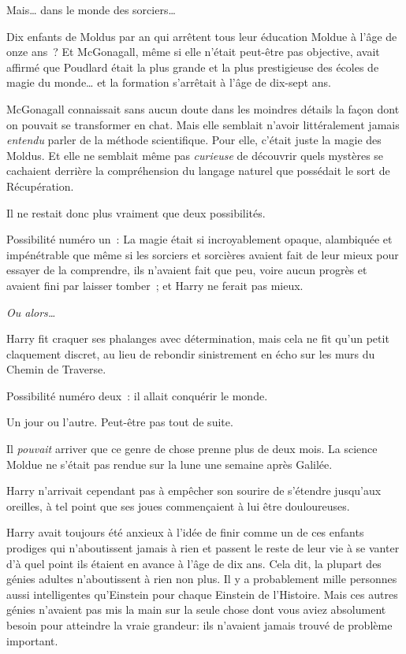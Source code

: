 Mais… dans le monde des sorciers…

Dix enfants de Moldus par an qui arrêtent tous leur éducation Moldue à l'âge de onze ans~?
Et McGonagall, même si elle n'était peut-être pas objective, avait affirmé que Poudlard était la plus grande et la plus prestigieuse des écoles de magie du monde… et la formation s'arrêtait à l'âge de dix-sept ans.

McGonagall connaissait sans aucun doute dans les moindres détails la façon dont on pouvait se transformer en chat.
Mais elle semblait n'avoir littéralement jamais \emph{entendu} parler de la méthode scientifique.
Pour elle, c'était juste la magie des Moldus.
Et elle ne semblait même pas \emph{curieuse} de découvrir quels mystères se cachaient derrière la compréhension du langage naturel que possédait le sort de Récupération.

Il ne restait donc plus vraiment que deux possibilités.

Possibilité numéro un~: La magie était si incroyablement opaque, alambiquée et impénétrable que même si les sorciers et sorcières avaient fait de leur mieux pour essayer de la comprendre, ils n'avaient fait que peu, voire aucun progrès et avaient fini par laisser tomber~; et Harry ne ferait pas mieux.

\emph{Ou alors…}

Harry fit craquer ses phalanges avec détermination, mais cela ne fit qu'un petit claquement discret, au lieu de rebondir sinistrement en écho sur les murs du Chemin de Traverse.

Possibilité numéro deux~: il allait conquérir le monde.

Un jour ou l'autre. Peut-être pas tout de suite.

Il \emph{pouvait} arriver que ce genre de chose prenne plus de deux mois.
La science Moldue ne s'était pas rendue sur la lune une semaine après Galilée.

Harry n'arrivait cependant pas à empêcher son sourire de s'étendre jusqu'aux oreilles, à tel point que ses joues commençaient à lui être douloureuses.

Harry avait toujours été anxieux à l'idée de finir comme un de ces enfants prodiges qui n'aboutissent jamais à rien et passent le reste de leur vie à se vanter d'à quel point ils étaient en avance à l'âge de dix ans.
Cela dit, la plupart des génies adultes n'aboutissent à rien non plus.
Il y a probablement mille personnes aussi intelligentes qu'Einstein pour chaque Einstein de l'Histoire.
Mais ces autres génies n'avaient pas mis la main sur la seule chose dont vous aviez absolument besoin pour atteindre la vraie grandeur: ils n'avaient jamais trouvé de problème important.

